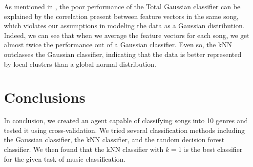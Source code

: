 \documentclass[journal,hidelinks]{IEEEtran}
\begin{document}
As mentioned in , the poor performance of the Total Gaussian classifier can be explained by the correlation present between feature vectors in the same song, which violates our assumptions in modeling the data as a Gaussian distribution. Indeed, we can see that when we average the feature vectors for each song, we get almost twice the performance out of a Gaussian classifier. Even so, the kNN outclasses the Gaussian classifier, indicating that the data is better represented by local clusters than a global normal distribution.

\section{Conclusions}

In conclusion, we created an agent capable of classifying songs into 10 genres and tested it using cross-validation. We tried several classification methods including the Gaussian classifier, the kNN classifier, and the random decision forest classifier. We then found that the kNN classifier with $k = 1$ is the best classifier for the given task of music classification.



\end{document}
